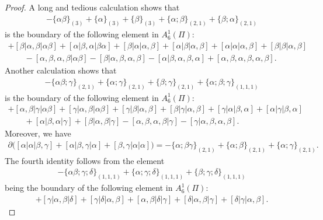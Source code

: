 \documentclass[pdftex]{sigma}
\numberwithin{equation}{section}
\begin{document}
\begin{proof}
 A long and tedious calculation shows that
 \begin{align*}
 -\{\alpha\beta\}_{(3)}+\{\alpha\}_{(3)}+\{\beta\}_{(3)}+\{\alpha;\beta\}_{(2,1)}+\{\beta;\alpha\}_{(2,1)}
 \end{align*}
 is the boundary of the following element in $A_{6}^1(\Pi)$:
 \begin{gather*}
 [\alpha,\beta|\alpha\beta|\alpha \beta]+[\beta|\alpha,\beta|\alpha \beta]+[\alpha|\beta,\alpha|\beta\alpha]+[\beta|\alpha|\alpha,\beta]+[\alpha|\beta|\alpha,\beta]+[\alpha|\alpha|\alpha,\beta]+[\beta|\beta|\alpha,\beta]\\
 \qquad{}-[\alpha,\beta,\alpha,\beta|\alpha\beta]-[\beta|\alpha,\beta,\alpha,\beta]-[\alpha|\beta,\alpha,\beta,\alpha]
 +[\alpha,\beta,\alpha,\beta,\alpha,\beta].
 \end{gather*}
 Another calculation shows that
 \begin{align*}
 -\{\alpha\beta;\gamma\}_{(2,1)}+\{\alpha;\gamma\}_{(2,1)}+\{\beta;\gamma\}_{(2,1)}+\{\alpha;\beta;\gamma\}_{(1,1,1)}
 \end{align*}
 is the boundary of the following element in $A_{6}^1(\Pi)$:
 \begin{gather*}
 [\alpha,\beta|\alpha\beta|\gamma]+[\alpha,\beta|\gamma|\alpha\beta]+[\gamma|\alpha,\beta|\alpha\beta]+[\gamma|\beta|\alpha,\beta]
 +[\beta|\gamma|\alpha,\beta]+[\gamma|\alpha|\beta,\alpha]+[\alpha|\gamma|\beta,
 \alpha]\\
 \qquad{}+[\alpha|\beta,\alpha|\gamma]+[\beta|\alpha,\beta|\gamma]-[\alpha,\beta,\alpha,\beta|\gamma]-[\gamma|\alpha,\beta,\alpha,\beta].
 \end{gather*}
 Moreover, we have
 \begin{align*}
 \partial \big([\alpha|\alpha|\beta,\gamma]+[\alpha|\beta,\gamma|\alpha]+[\beta,\gamma|\alpha|\alpha] \big)= -\{\alpha;\beta\gamma\}_{(2,1)}+\{\alpha;\beta\}_{(2,1)}+\{\alpha;\gamma\}_{(2,1)}.
 \end{align*}
 The fourth identity follows from the element
 \begin{align*}
 -\{\alpha\beta;\gamma;\delta\}_{(1,1,1)}+\{\alpha;\gamma;\delta\}_{(1,1,1)}+\{\beta;\gamma;\delta\}_{(1,1,1)}
 \end{align*}
 being the boundary of the following element in $A_{6}^1(\Pi)$:
 \begin{gather*}
 [\alpha,\beta|\gamma|\delta]+[\gamma|\alpha,\beta|\delta]+[\gamma|\delta|\alpha,\beta]+[\alpha,\beta|\delta|\gamma]+[\delta|\alpha,\beta|\gamma]+[\delta|\gamma|\alpha,\beta].

\end{gather*}
\end{proof}
\end{document}
